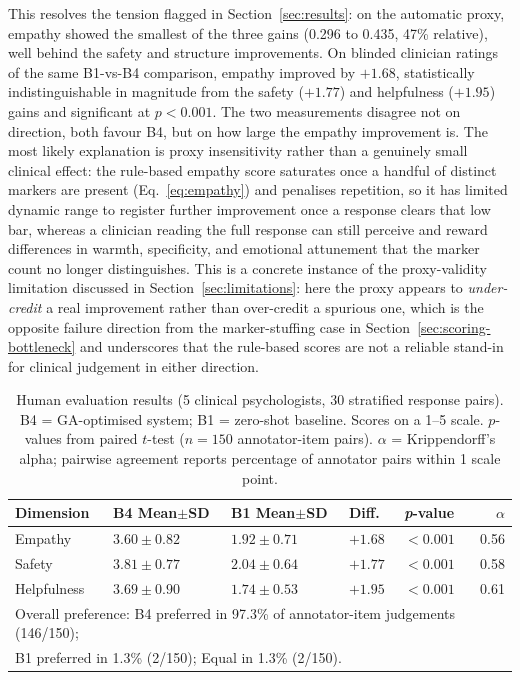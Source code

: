 \documentclass[mathematics,article,xetex,moreauthors]{Definitions/mdpi}
\begin{document}
This resolves the tension flagged in Section~\ref{sec:results}: on the
automatic proxy, empathy showed the smallest of the three gains
(0.296 to 0.435, 47\% relative), well behind the safety and structure
improvements. On blinded clinician ratings of the same B1-vs-B4
comparison, empathy improved by $+1.68$, statistically indistinguishable
in magnitude from the safety ($+1.77$) and helpfulness ($+1.95$) gains
and significant at $p<0.001$. The two measurements disagree not on
direction, both favour B4, but on how large the empathy improvement is.
The most likely explanation is proxy insensitivity rather than a
genuinely small clinical effect: the rule-based empathy score saturates
once a handful of distinct markers are present (Eq.~\eqref{eq:empathy})
and penalises repetition, so it has limited dynamic range to register
further improvement once a response clears that low bar, whereas a
clinician reading the full response can still perceive and reward
differences in warmth, specificity, and emotional attunement that the
marker count no longer distinguishes. This is a concrete instance of
the proxy-validity limitation discussed in
Section~\ref{sec:limitations}: here the proxy appears to
\emph{under-credit} a real improvement rather than over-credit a
spurious one, which is the opposite failure direction from the
marker-stuffing case in Section~\ref{sec:scoring-bottleneck} and
underscores that the rule-based scores are not a reliable stand-in for
clinical judgement in either direction.

\begin{table}[H]
\centering
\caption{Human evaluation results (5 clinical psychologists, 30
stratified response pairs). B4 = GA-optimised system;
B1 = zero-shot baseline. Scores on a 1--5 scale.
$p$-values from paired $t$-test ($n=150$ annotator-item pairs).
$\alpha$ = Krippendorff's alpha; pairwise agreement reports
percentage of annotator pairs within 1 scale point.}
\label{tab:human_eval}
\renewcommand{\arraystretch}{1.3}
\begin{tabularx}{\textwidth}{lXXXXr}
\hline
\textbf{Dimension} & \textbf{B4 Mean$\pm$SD} & \textbf{B1 Mean$\pm$SD} &
\textbf{Diff.} & \textbf{\textit{p}-value} & $\alpha$ \\
\hline
Empathy     & $3.60 \pm 0.82$ & $1.92 \pm 0.71$ & $+1.68$ & $<0.001$ & 0.56 \\
Safety      & $3.81 \pm 0.77$ & $2.04 \pm 0.64$ & $+1.77$ & $<0.001$ & 0.58 \\
Helpfulness & $3.69 \pm 0.90$ & $1.74 \pm 0.53$ & $+1.95$ & $<0.001$ & 0.61 \\
\hline
\multicolumn{6}{l}{Overall preference: B4 preferred in 97.3\% of
annotator-item judgements (146/150);} \\
\multicolumn{6}{l}{B1 preferred in 1.3\% (2/150); Equal in 1.3\% (2/150).} \\
\hline
\end{tabularx}
\end{table}
\end{document}

